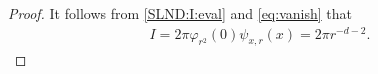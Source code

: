 \documentclass[reqno]{amsart}
\newcommand{\R}{\mathbb R}
\renewcommand{\d}{\mathrm d}
\newcommand{\e}{\mathrm e}
\newcommand{\1}{\mathbf 1}
\newcommand{\inner}[2]{\langle #1,#2\rangle}
\numberwithin{equation}{section}
\theoremstyle{definition}
\begin{document}
\begin{proof}
It follows from \eqref{SLND:I:eval} and \eqref{eq:vanish} that
\begin{align}\label{SLND:I:value}
    I
    =2\pi\varphi_{r^2}(0)\psi_{x,r}(x)
    =2\pi r^{-d-2}.
\end{align}


\end{proof}
\end{document}
